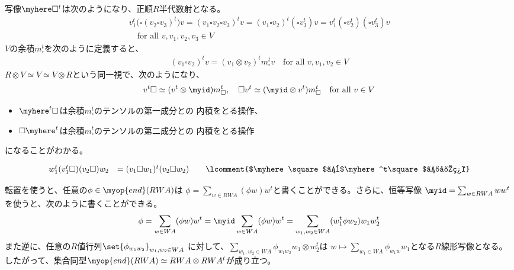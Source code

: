 	写像$\myhere\square^t$は次のようになり、正順$R$半代数射となる。
	\begin{equation*}\begin{split} %
		v_1^t\bigl(\square(v_2\square v_3)^t\bigr)v
		= (v_1\square v_2\square v_3)^t v 
		= (v_1\square v_2)^t (\square v_3^t) v 
		= v_1^t (\square v_2^t)(\square v_3^t) v \\
		\quad\text{for all }v,v_1,v_2,v_3\in V
	\end{split}\end{equation*} %
	$V$の余積$m_\square^t$を次のように定義すると、
	\begin{equation*}\begin{split} %
		(v_1\square v_2)^tv = (v_1\otimes v_2)^tm_\square^tv
		\quad\text{for all }v,v_1,v_2\in V
	\end{split}\end{equation*} %
	$R\otimes V\simeq V\simeq V\otimes R$という同一視で、次のようになり、
	\begin{equation*}\begin{split} %
		v^t\square \simeq (v^t\otimes \myid)m_\square^t
		,\quad \square v^t \simeq (\myid\otimes v^t)m_\square^t
		\quad\text{for all }v\in V
	\end{split}\end{equation*} %
	\begin{itemize}\setlength{\itemsep}{-1mm} %
		\item $\myhere^t\square$は余積$m_\square^t$のテンソルの第一成分との
		内積をとる操作、
		\item $\square\myhere^t$は余積$m_\square^t$のテンソルの第二成分との
		内積をとる操作
	\end{itemize} %
	になることがわかる。

	\begin{todo}[交換関係]\label{todo:交換関係} %
		\begin{equation*}\begin{array}{rll} %
			w_1^t(v_1^t\square)(v_2\square)w_2
			&= (v_1\square w_1)^t(v_2\square w_2)
			&\quad\lcomment{$\myhere\square$と$\myhere^t\square$の定義} \\
		\end{array}\end{equation*} %
	\end{todo} %

	転置を使うと、任意の$\phi\in\myop{end}(RWA)$は
	$\phi=\sum_{w\in RWA}(\phi w)w^t$と書くことができる。さらに、恒等写像
	$\myid=\sum_{w\in RWA}ww^t$を使うと、次のように書くことができる。
	\begin{equation*}\begin{split} %
		\phi = \sum_{w\in WA}(\phi w)w^t 
		= \myid\sum_{w\in WA}(\phi w)w^t
		= \sum_{w_1,w_2\in WA}(w_1^t\phi w_2)w_1w_2^t
	\end{split}\end{equation*} %
	また逆に、任意の$R$値行列$\set{\phi_{w_1w_2}}_{w_1,w_2\in WA}$
	に対して、$\sum_{w_1,w_2\in WA}\phi_{w_1w_2}w_1\otimes w_2^t$は
	$w\mapsto \sum_{w_1\in WA}\phi_{w_1w}w_1$となる$R$線形写像となる。
	したがって、集合同型$\myop{end}(RWA)\simeq RWA\otimes RWA^t$が成り立つ。

